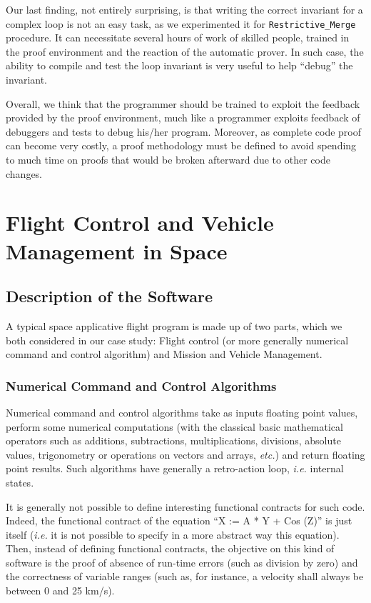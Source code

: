 \documentclass[10pt,a4paper,twocolumn]{article}
\newcommand{\etc}{\textit{etc.}\xspace}
\newcommand{\ie}{\textit{i.e.}\xspace}
\newcommand{\SPARK}[1]{\lstinline[language=Ada,basicstyle={\footnotesize
      \sffamily},framesep=0pt]$#1$}
\begin{document}
Our last finding, not entirely surprising, is that writing the correct
invariant for a complex loop is not an easy task, as we experimented
it for \SPARK{Restrictive_Merge} procedure. It can necessitate several
hours of work of skilled people, trained in the proof environment and
the reaction of the automatic prover. In such case, the ability to
compile and test the loop invariant is very useful to help ``debug''
the invariant.

Overall, we think that the programmer should be trained to exploit the
feedback provided by the proof environment, much like a programmer
exploits feedback of debuggers and tests to debug his/her program.
Moreover, as complete code proof can become very costly, a proof
methodology must be defined to avoid spending to much time on proofs
that would be broken afterward due to other code changes.


\section{Flight Control and Vehicle Management in Space}

\subsection{Description of the Software}

A typical space applicative flight program is made up of two parts, which we
both considered in our case study:
Flight control (or more generally numerical command and control algorithm) and
Mission and Vehicle Management.

\subsubsection{Numerical Command and Control Algorithms}

Numerical command and control algorithms take as inputs floating point values,
perform some numerical computations (with the classical basic mathematical
operators such as additions, subtractions, multiplications, divisions, absolute
values, trigonometry or operations on vectors and arrays, \etc) and return
floating point results. Such algorithms have generally a retro-action loop, \ie
internal states.

It is generally not possible to define interesting functional contracts for
such code. Indeed, the functional contract of the equation
``X := A * Y + Cos (Z)''
is just itself (\ie it is not possible to specify in a more abstract way this
equation). Then, instead of defining functional contracts, the objective on
this kind of software is the proof of absence of run-time errors (such as
division by zero) and the correctness of variable ranges (such as, for
instance, a velocity shall always be between 0 and 25 km/s).
\end{document}

